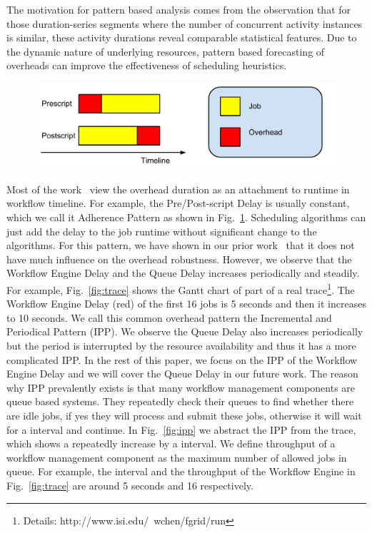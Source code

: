 \documentclass[final,5p,times,twocolumn]{elsarticle}
\begin{document}
The motivation for pattern based analysis comes from the observation that for those duration-series segments where the number of concurrent activity instances is similar, these activity durations reveal comparable statistical features. Due to the dynamic nature of underlying resources, pattern based forecasting of overheads can improve the effectiveness of scheduling heuristics. 

\begin{figure}[htb]
\centering
 \includegraphics[width=1\linewidth]{figure/adherence.pdf}
  \label{fig:adhere}
  \vspace{-10pt}
\end{figure}

Most of the work~\cite{Dong2010, Yang03} view the overhead duration as an attachment to runtime in workflow timeline. For example, the Pre/Post-script Delay is usually constant, which we call it Adherence Pattern as shown in Fig.~\ref{fig:adhere}. Scheduling algorithms can just add the delay to the job runtime without significant change to the algorithms. For this pattern, we have shown in our prior work~\cite{Chen} that it does not have much influence on the overhead robustness. 
However, we observe that the Workflow Engine Delay and the Queue Delay increases periodically and steadily. For example, Fig.~\ref{fig:trace} shows the Gantt chart of part of a real trace\footnote{Details: http://www.isi.edu/\string~wchen/fgrid/run}. 
The Workflow Engine Delay (red) of the first 16 jobs is 5 seconds and then it increases to 10 seconds. 
We call this common overhead pattern the Incremental and Periodical Pattern (IPP). We observe the Queue Delay also increases periodically but the period is interrupted by the resource availability and thus it has a more complicated IPP. In the rest of this paper, we focus on the IPP of the Workflow Engine Delay and we will cover the Queue Delay in our future work. 
The reason why IPP prevalently exists is that many workflow management components are queue based systems. They repeatedly check their queues to find whether there are idle jobs, if yes they will process and submit these jobs, otherwise it will wait for a interval and continue. In Fig.~\ref{fig:ipp} we abstract the IPP from the trace, which shows a repeatedly increase by a interval. We define throughput of a workflow management component as the maximum number of allowed jobs in queue. For example, the interval and the throughput of the Workflow Engine in Fig.~\ref{fig:trace} are around 5 seconds and 16 respectively. 
\end{document}
